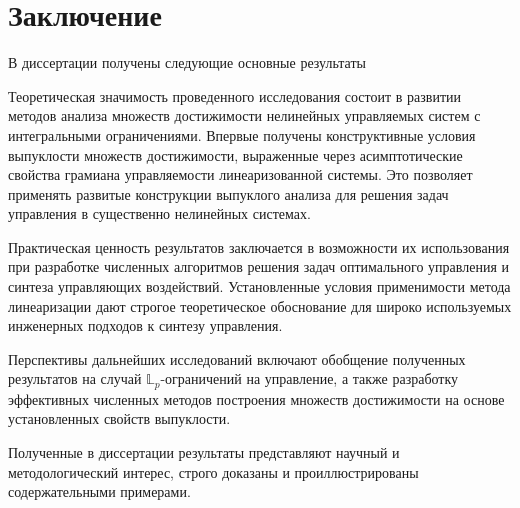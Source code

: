 \documentclass[../main.tex]{subfiles}
\begin{document}
\section*{Заключение}
В диссертации получены следующие основные результаты


Теоретическая значимость проведенного исследования состоит в развитии методов анализа множеств достижимости нелинейных управляемых систем с интегральными ограничениями. 
Впервые получены конструктивные условия выпуклости множеств достижимости, выраженные через асимптотические свойства грамиана управляемости линеаризованной системы. 
Это позволяет применять развитые конструкции выпуклого анализа для решения задач управления в существенно нелинейных системах.

Практическая ценность результатов заключается в возможности их использования при разработке численных алгоритмов решения задач оптимального управления и синтеза управляющих воздействий. 
Установленные условия применимости метода линеаризации дают строгое теоретическое обоснование для широко используемых инженерных подходов к синтезу управления.

Перспективы дальнейших исследований включают обобщение полученных результатов на случай $\mathbb{L}_p$-ограничений на управление, а также разработку эффективных численных методов построения множеств достижимости на основе установленных свойств выпуклости.

Полученные в диссертации результаты представляют научный и методологический интерес, строго доказаны и проиллюстрированы содержательными примерами.
\end{document}
